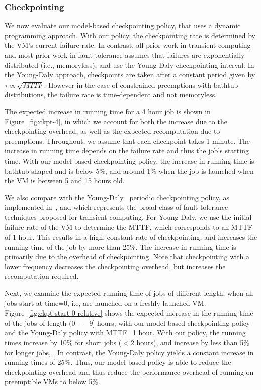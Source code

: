 \subsubsection{Checkpointing}
\label{subsec:eval-ckpt}

We now evaluate our model-based checkpointing policy, that uses a dynamic programming approach.
With our policy, the checkpointing rate is determined by the VM's current failure rate.
In contrast, all prior work in transient computing and most prior work in fault-tolerance assumes that failures are exponentially distributed (i.e., memoryless), and use the Young-Daly checkpointing interval.
In the Young-Daly approach, checkpoints are taken after a constant period given by $\tau \propto \sqrt{MTTF}$.
%
However in the case of constrained preemptions with bathtub distributions, the failure rate is time-dependent and not memoryless. 


The expected increase in running time for a 4 hour job is shown in Figure~\ref{fig:ckpt-4}, in which we account for both the increase due to the checkpointing overhead, as well as the expected recomputation due to preemptions. 
Throughout, we assume that each checkpoint takes 1 minute. 
The increase in running time depends on the failure rate and thus the job's starting time. 
With our model-based checkpointing policy, the increase in running time is bathtub shaped and is below 5\%, and around 1\% when the job is launched when the VM is between 5 and 15 hours old. 

We also compare with the Young-Daly~\cite{daly2006higher} periodic checkpointing policy, as implemented in~\cite{flint, proteus-eur17, marathe2014exploiting}, and which represents the broad class of fault-tolerance techniques proposed for transient computing. 
%
For Young-Daly, we use the initial failure rate of the VM to determine the MTTF, which corresponds to an MTTF of 1 hour. 
This results in a high, constant rate of checkpointing, and increases the running time of the job by more than 25\%.
The increase in running time is primarily due to the overhead of checkpointing. 
Note that checkpointing with a lower frequency decreases the checkpointing overhead, but increases the recomputation required.

Next, we examine the expected running time of jobs of different length, when all jobs start at time=0, i.e, are launched on a freshly launched VM.
Figure~\ref{fig:ckpt-start-0-relative} shows the expected increase in the running time of the jobs of length $(0--9] $ hours, with our model-based checkpointing policy and the Young-Daly policy with MTTF=1 hour.
With our policy, the running times increase by 10\% for short jobs ($<2$  hours), and increase by less than 5\% for longer jobs, .
In contrast, the Young-Daly policy yields a constant increase in running times of 25\%. 
Thus, our model-based policy is able to reduce the checkpointing overhead and thus reduce the performance overhead of running on preemptible VMs to below 5\%. 

